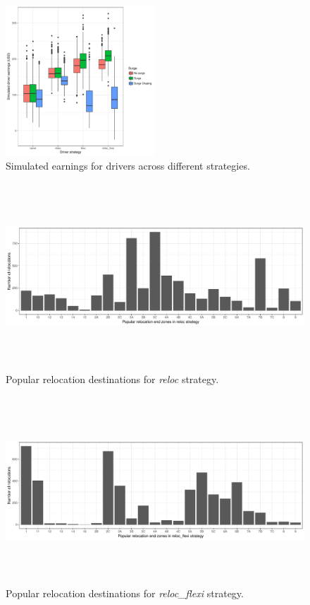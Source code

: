 \begin{figure}
	\label{fig:simulated_earnings}
	\caption{Simulated earnings for drivers across different strategies.}
	\includegraphics[width=0.5\textwidth,height=0.4\textwidth]{figures/simulated_earnings.pdf}
\end{figure}

\begin{figure}
	\label{fig:reloc_end_zones}
	\caption{Popular relocation destinations for \textit{reloc} strategy.}
	\includegraphics[width=\textwidth,height=7cm]{figures/reloc_end_zones.pdf}
\end{figure}

\begin{figure}
	\label{fig:reloc_flexi_end_zones}
	\caption{Popular relocation destinations for \textit{reloc\_flexi} strategy.}
	\includegraphics[width=\textwidth,height=7cm]{figures/reloc_flexi_end_zones.pdf}
\end{figure}
